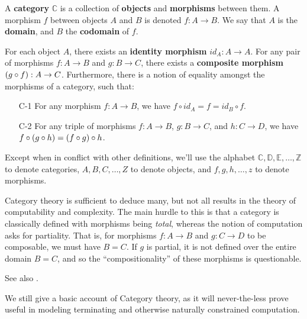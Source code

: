 \begin{specification} A \textbf{category} $\mathbb{C}$ is a collection of
\textbf{objects} and \textbf{morphisms} between them. A morphism $f$ between
objects $A$ and $B$ is denoted $f:A\rightarrow B$. We say that $A$ is the
\textbf{domain}, and $B$ the \textbf{codomain} of $f$.

For each object $A$, there exists an \textbf{identity morphism}
$id_A:A\rightarrow A$. For any pair of morphisms $f : A\rightarrow B$ and $g :
B \rightarrow C$, there exists a \textbf{composite morphism} ${\mathopen{}\left({g\circ f}\right)\mathclose{}} : A
\rightarrow C$.  Furthermore, there is a notion of equality amongst the
morphisms of a category, such that:

\begin{enumerate}

\item [C-1] For any morphism $f:A\rightarrow B$, we have $f\circ id_A = f =
id_B \circ f$.

\item [C-2] For any triple of morphisms $f : A \rightarrow B$, $g : B
\rightarrow C$, and $h : C \rightarrow D$, we have $f\circ {\ensuremath{\mathopen{}\left({g \circ h}\right)\mathclose{}}} =
{\mathopen{}\left({f\circ g}\right)\mathclose{}} \circ h$.

\end{enumerate}

\end{specification}

\begin{notation} Except when in conflict with other definitions, we'll use the
alphabet $\mathbb{C},\mathbb{D},\mathbb{E},\ldots,\mathbb{Z}$ to denote
categories, $A,B,C,\ldots,Z$ to denote objects, and $f,g,h,\ldots,z$ to denote
morphisms.  \end{notation}


Category theory is sufficient to deduce many, but not all results in the theory
of computability and complexity\cite{di-paola-heller-1987}. The main hurdle to
this is that a category is classically defined with morphisms being
\emph{total}, whereas the notion of computation asks for partiality. That is,
for morphisms $f : A \rightarrow B$ and $g : C \rightarrow D$ to be composable,
we must have $B=C$. If $g$ is partial, it is not defined over the entire domain
$B=C$, and so the ``compositionality'' of these morphisms is questionable.

See also \cite{moggi-1991}.

We still give a basic account of Category theory, as it will never-the-less
prove useful in modeling terminating and otherwise naturally constrained
computation.


